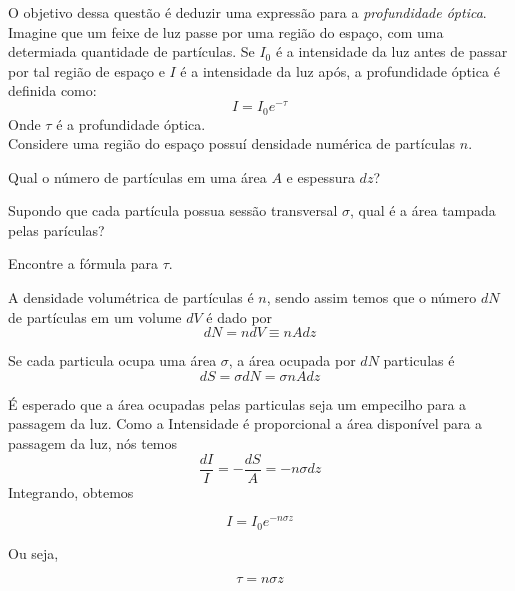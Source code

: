 \documentclass[11pt]{article}
\begin{document}
\begin{pproblem}
    O objetivo dessa questão é deduzir uma expressão para a \textit{profundidade óptica}. Imagine que um feixe de luz passe por uma região do espaço, com uma determiada quantidade de partículas. Se \(I_0\) é a intensidade da luz antes de passar por tal região de espaço e \(I\) é a intensidade da luz após, a profundidade óptica é definida como:
    \[I = I_0e^{-\tau}\]
    Onde \(\tau\) é a profundidade óptica.
    \\
    Considere uma região do espaço possuí densidade numérica de partículas \(n\).
    \begin{alternativas}
        \item Qual o número de partículas em uma área \(A\) e espessura \(dz\)?
        \item Supondo que cada partícula possua sessão transversal \(\sigma\), qual é a área tampada pelas parículas?
        \item Encontre a fórmula para \(\tau\). 
    \end{alternativas}

\begin{pssolution*}{}{}
    \begin{alternativas}
        \item A densidade volumétrica de partículas é \(n\), sendo assim temos que o número \(dN\) de partículas em um volume \(dV\) é dado por
        \[\boxed{dN = ndV \equiv nAdz}\]

        \item Se cada particula ocupa uma área \(\sigma\), a área ocupada por \(dN\) particulas é
        \[\boxed{dS = \sigma dN = \sigma nAdz}\]

        \item É esperado que a área ocupadas pelas particulas seja um empecilho para a passagem da luz. Como a Intensidade é proporcional a área disponível para a passagem da luz, nós temos
        \[\frac{dI}{I} = -\frac{dS}{A} = -n\sigma dz\]
        Integrando, obtemos

        \[I = I_0 e^{-n\sigma z}\]

        Ou seja, 

        \[\boxed{\tau = n\sigma z}\]
    \end{alternativas}
\end{pssolution*}
\end{pproblem}
\end{document}
